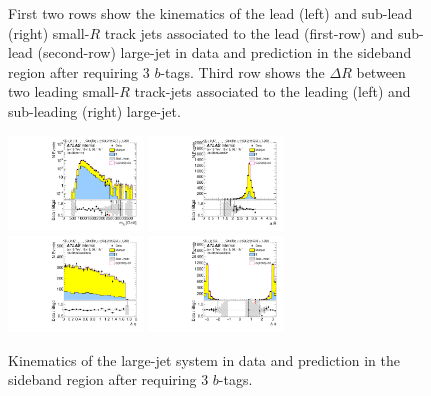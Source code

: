 \begin{figure}[htbp!]
\begin{center}
  \caption{First two rows show the kinematics of the lead (left) and sub-lead (right) small-$R$ track jets associated to the lead (first-row) and sub-lead (second-row) large-\R jet in data and prediction in the sideband region after requiring 3 $b$-tags. Third row shows the $\Delta R$ between two leading small-$R$ track-jets associated to the leading (left) and sub-leading (right) large-\R jet. }
  \label{fig:boosted-3b-sideband-ak2}
\end{center}
\end{figure}


\begin{figure}[htbp!]
\begin{center}
\includegraphics[width=0.32\textwidth,angle=-90]{figures/boosted/Sideband/b77_ThreeTag_Sideband_mHH_l_1.pdf}
\includegraphics[width=0.32\textwidth,angle=-90]{figures/boosted/Sideband/b77_ThreeTag_Sideband_hCandDr.pdf}\\
\includegraphics[width=0.32\textwidth,angle=-90]{figures/boosted/Sideband/b77_ThreeTag_Sideband_hCandDeta.pdf}
\includegraphics[width=0.32\textwidth,angle=-90]{figures/boosted/Sideband/b77_ThreeTag_Sideband_hCandDphi.pdf}
  \caption{Kinematics of the large-\R jet system in data and prediction in the sideband region after requiring 3 $b$-tags. }
  \label{fig:boosted-3b-sideband-ak10-system}
\end{center}
\end{figure}

